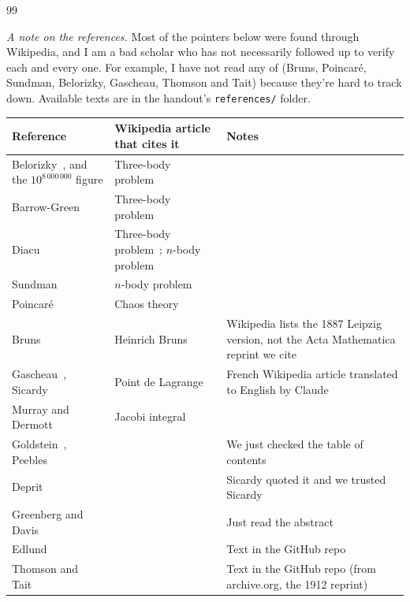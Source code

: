 \documentclass[12pt]{article}
\numberwithin{equation}{section}
\begin{document}
\begin{thebibliography}{99}
\item[] \emph{A note on the references.} Most of the pointers below were found through
  Wikipedia, and I am a bad scholar who has not necessarily followed up to
  verify each and every one.
  For example, I have not read any of (Bruns, Poincar\'e, Sundman, Belorizky,
  Gascheau, Thomson and Tait) because they're hard to track down. Available texts are in the handout's \texttt{references/} folder.

  \smallskip
  {\footnotesize{}\begin{tabular}{@{}l >{\raggedright\arraybackslash}p{4.6cm} >{\raggedright\arraybackslash}p{4.6cm}@{}}
  \toprule
  Reference & Wikipedia article that cites it & Notes \\
  \midrule
  Belorizky~\cite{belorizky}, and the $10^{8\,000\,000}$ figure & Three-body problem~\cite{threebody-wiki} & \\
  Barrow-Green~\cite{barrowgreen} & Three-body problem~\cite{threebody-wiki} & \\
  Diacu~\cite{diacu} & Three-body problem~\cite{threebody-wiki}; $n$-body problem~\cite{nbody-wiki} & \\
  Sundman~\cite{sundman} & $n$-body problem~\cite{nbody-wiki} & \\
  Poincar\'e~\cite{poincare} & Chaos theory~\cite{chaos-wiki} & \\
  Bruns~\cite{bruns} & Heinrich Bruns~\cite{bruns-wiki} & Wikipedia lists the 1887 Leipzig version, not the Acta Mathematica reprint we cite \\
  Gascheau~\cite{gascheau}, Sicardy~\cite{sicardy} & Point de Lagrange~\cite{lagrange-fr-wiki} & French Wikipedia article translated to English by Claude \\
  Murray and Dermott~\cite{murray} & Jacobi integral~\cite{jacobi-wiki} & \\
  Goldstein~\cite{goldstein}, Peebles~\cite{peebles} & & We just checked the table of contents \\
  Deprit~\cite{deprit} & & Sicardy quoted it and we trusted Sicardy \\
  Greenberg and Davis~\cite{greenberg} & & Just read the abstract \\
  Edlund~\cite{edlund} & & Text in the GitHub repo \\
  Thomson and Tait~\cite{thomsontait} & & Text in the GitHub repo (from archive.org, the 1912 reprint) \\

\end{tabular}}
\end{thebibliography}
\end{document}
